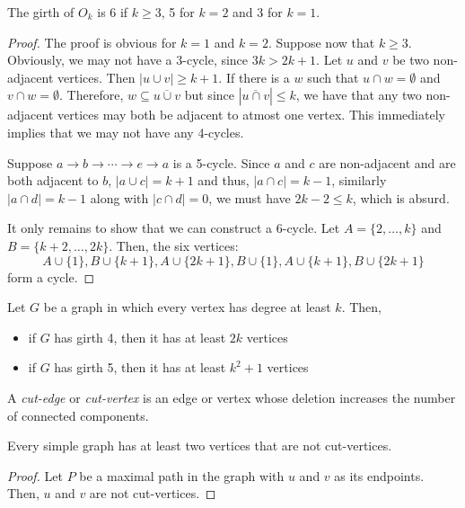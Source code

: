 \begin{proposition}
    The girth of $O_k$ is 6 if $k\ge 3$, 5 for $k = 2$ and 3 for $k = 1$.
\end{proposition}
\begin{proof}
    The proof is obvious for $k = 1$ and $k = 2$. Suppose now that $k\ge 3$. Obviously, we may not have a 3-cycle, since $3k > 2k + 1$. Let $u$ and $v$ be two non-adjacent vertices. Then $|u\cup v|\ge k + 1$. If there is a $w$ such that $u\cap w = \emptyset$ and $v\cap w = \emptyset$. Therefore, $w\subseteq\overline{u\cup v}$ but since $|\overline{u\cap v}|\le k$, we have that any two non-adjacent vertices may both be adjacent to atmost one vertex. This immediately implies that we may not have any 4-cycles.

    Suppose $a\rightarrow b\rightarrow\cdots\rightarrow e\rightarrow a$ is a 5-cycle. Since $a$ and $c$ are non-adjacent and are both adjacent to $b$, $|a\cup c| = k + 1$ and thus, $|a\cap c| = k - 1$, similarly $|a\cap d| = k - 1$ along with $|c\cap d| = 0$, we must have $2k - 2 \le k$, which is absurd.

    It only remains to show that we can construct a $6$-cycle. Let $A = \{2,\ldots,k\}$ and $B = \{k + 2,\ldots, 2k\}$. Then, the six vertices:
    \begin{equation*}
        A\cup\{1\}, B\cup\{k + 1\}, A\cup\{2k + 1\}, B\cup\{1\}, A\cup\{k + 1\}, B\cup\{2k + 1\}
    \end{equation*}
    form a cycle.
\end{proof}

\begin{proposition}
    Let $G$ be a graph in which every vertex has degree at least $k$. Then, 
    \begin{itemize}
        \item if $G$ has girth 4, then it has at least $2k$ vertices 
        \item if $G$ has girth 5, then it has at least $k^2 + 1$ vertices
    \end{itemize}
\end{proposition}

\begin{definition}
    A \textit{cut-edge} or \textit{cut-vertex} is an edge or vertex whose deletion increases the number of connected components.
\end{definition}

\begin{proposition}
    Every simple graph has at least two vertices that are not cut-vertices.
\end{proposition}
\begin{proof}
    Let $P$ be a maximal path in the graph with $u$ and $v$ as its endpoints. Then, $u$ and $v$ are not cut-vertices.
\end{proof}

